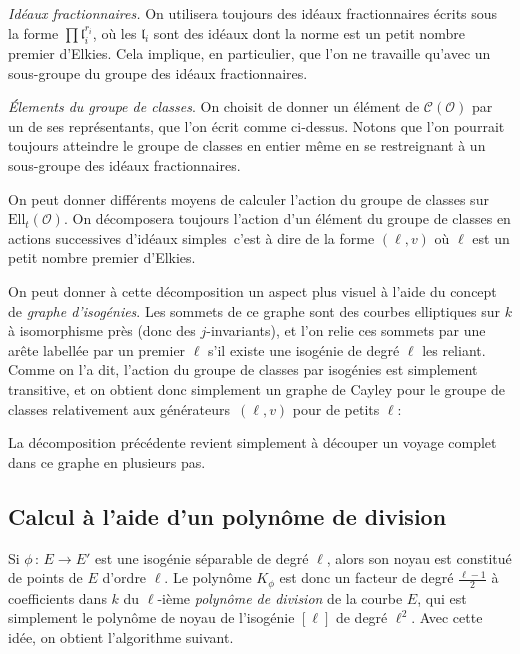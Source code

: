 \documentclass[11pt,a4paper]{article}
\renewcommand{\O}{\mathcal{O}}
\newcommand{\Cl}{\mathcal{C}}
\newcommand{\vers}{\longrightarrow}
\newcommand{\Ell}{\mathrm{Ell}}
\renewcommand{\frak}{\mathfrak}
\newcommand{\de}{\,:\,}
\renewcommand{\v}{\vspace{5mm}}
\theoremstyle{definition}
\begin{document}
\emph{Idéaux fractionnaires.} On utilisera toujours des idéaux fractionnaires écrits sous la forme $\prod {\frak l}_i^{r_i}$, où les ${\frak l}_i$ sont des idéaux dont la norme est un petit nombre premier d'Elkies. Cela implique, en particulier, que l'on ne travaille qu'avec un sous-groupe du groupe des idéaux fractionnaires.
\v

\emph{\'Elements du groupe de classes}. On choisit de donner un élément de $\Cl(\O)$ par un de ses représentants, que l'on écrit comme ci-dessus. Notons que l'on pourrait toujours atteindre le groupe de classes en entier même en se restreignant à un sous-groupe des idéaux fractionnaires.

On peut donner différents moyens de calculer l'action du groupe de classes sur $\Ell_t(\O)$. On décomposera toujours l'action d'un élément du groupe de classes en actions successives d'idéaux \og simples\fg\, c'est à dire de la forme $(\ell, v)$ où $\ell$ est un petit nombre premier d'Elkies.
\v

On peut donner à cette décomposition un aspect plus visuel à l'aide du concept de \emph{graphe d'isogénies}. Les sommets de ce graphe sont des courbes elliptiques sur $k$ à isomorphisme près (donc des $j$-invariants), et l'on relie ces sommets par une arête labellée par un premier $\ell$ s'il existe une isogénie de degré $\ell$ les reliant. Comme on l'a dit, l'action du groupe de classes par isogénies est simplement transitive, et on obtient donc simplement un graphe de Cayley pour le groupe de classes relativement aux \og générateurs\fg\ $(\ell, v)$ pour de petits $\ell$:



La décomposition précédente revient simplement à découper un voyage complet dans ce graphe en plusieurs pas.

\subsection{Calcul à l'aide d'un polynôme de division}

Si $\phi\de E\vers E'$ est une isogénie séparable de degré $\ell$, alors son noyau est constitué de points de $E$ d'ordre $\ell$. Le polynôme $K_\phi$ est donc un facteur de degré $\frac{\ell-1}{2}$ à coefficients dans $k$ du $\ell$-ième \emph{polynôme de division} de la courbe $E$, qui est simplement le polynôme de noyau de l'isogénie $[\ell]$ de degré $\ell^2$. Avec cette idée, on obtient l'algorithme suivant.
\end{document}
